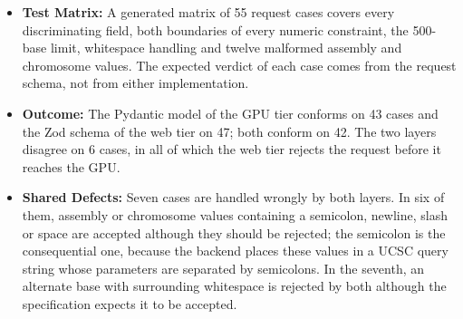 \begin{itemize}
\item \textbf{Test Matrix:} A generated matrix of 55 request cases covers every discriminating field, both boundaries of every numeric constraint, the 500-base limit, whitespace handling and twelve malformed assembly and chromosome values. The expected verdict of each case comes from the request schema, not from either implementation.
\item \textbf{Outcome:} The Pydantic model of the GPU tier conforms on 43 cases and the Zod schema of the web tier on 47; both conform on 42. The two layers disagree on 6 cases, in all of which the web tier rejects the request before it reaches the GPU.
\item \textbf{Shared Defects:} Seven cases are handled wrongly by both layers. In six of them, assembly or chromosome values containing a semicolon, newline, slash or space are accepted although they should be rejected; the semicolon is the consequential one, because the backend places these values in a UCSC query string whose parameters are separated by semicolons. In the seventh, an alternate base with surrounding whitespace is rejected by both although the specification expects it to be accepted.
\end{itemize}

